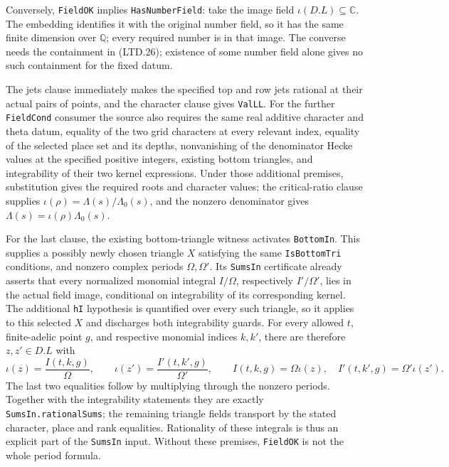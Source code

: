 Conversely, \texttt{FieldOK} implies \texttt{HasNumberField}:
take the image field \(\iota(D.L)\subseteq\mathbb C\).
The embedding identifies it with the original number field,
so it has the same finite dimension over \(\mathbb Q\);
every required number is in that image.  The converse needs
the containment in (LTD.26); existence of some number field
alone gives no such containment for the fixed datum.

The jets clause immediately makes the specified top and row
jets rational at their actual pairs of points, and the
character clause gives \texttt{ValLL}.  For the further
\texttt{FieldCond} consumer the source also requires the same
real additive character and theta datum, equality of the two
grid characters at every relevant index, equality of the
selected place set and its depths, nonvanishing of the
denominator Hecke values at the specified positive integers,
existing bottom triangles, and integrability of their two
kernel expressions.  Under those additional premises,
substitution gives the required roots and character values;
the critical-ratio clause supplies
\(\iota(\rho)=\Lambda(s)/\Lambda_0(s)\), and the nonzero
denominator gives \(\Lambda(s)=\iota(\rho)\Lambda_0(s)\).

For the last clause, the existing bottom-triangle witness
activates \texttt{BottomIn}.  This supplies a possibly newly
chosen triangle \(X\) satisfying the same \texttt{IsBottomTri}
conditions, and nonzero complex periods \(\Omega,\Omega'\).
Its \texttt{SumsIn} certificate already asserts that every
normalized monomial integral \(I/\Omega\), respectively
\(I'/\Omega'\), lies in the actual field image, conditional on
integrability of its corresponding kernel.  The additional
\texttt{hI} hypothesis is quantified over every such triangle,
so it applies to this selected \(X\) and discharges both
integrability guards.  For every allowed \(t\), finite-adelic
point \(g\), and respective monomial indices \(k,k'\), there are
therefore
\(z,z'\in D.L\) with
\[
 \iota(z)=\frac{I(t,k,g)}{\Omega},\qquad
 \iota(z')=\frac{I'(t,k',g)}{\Omega'},\qquad
 I(t,k,g)=\Omega\iota(z),\quad
 I'(t,k',g)=\Omega'\iota(z').
 \tag{LTD.27}
\]
The last two equalities follow by multiplying through the
nonzero periods.  Together with the integrability statements
they are exactly \texttt{SumsIn.rationalSums}; the remaining
triangle fields transport by the stated character, place and
rank equalities.  Rationality of these integrals is thus an
explicit part of the \texttt{SumsIn} input.  Without these
premises, \texttt{FieldOK} is not the whole period formula.

